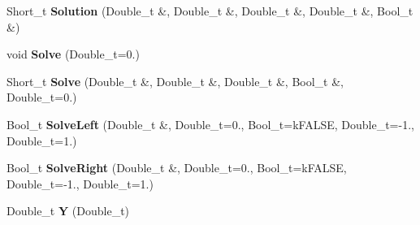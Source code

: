 \begin{DoxyCompactItemize}
\item 
\hypertarget{classTPoly3_aa320c3c29151434c537c06fb79dd5713}{Short\-\_\-t {\bfseries Solution} (Double\-\_\-t \&, Double\-\_\-t \&, Double\-\_\-t \&, Double\-\_\-t \&, Bool\-\_\-t \&)}\label{classTPoly3_aa320c3c29151434c537c06fb79dd5713}

\item 
\hypertarget{classTPoly3_acaf258c863d48dcb936b145ed6062e3b}{void {\bfseries Solve} (Double\-\_\-t=0.)}\label{classTPoly3_acaf258c863d48dcb936b145ed6062e3b}

\item 
\hypertarget{classTPoly3_a95f6a8297f08639f23e04de072ab81c1}{Short\-\_\-t {\bfseries Solve} (Double\-\_\-t \&, Double\-\_\-t \&, Double\-\_\-t \&, Bool\-\_\-t \&, Double\-\_\-t=0.)}\label{classTPoly3_a95f6a8297f08639f23e04de072ab81c1}

\item 
\hypertarget{classTPoly3_ad696d45f90cef69580ab4e10da7c80d5}{Bool\-\_\-t {\bfseries Solve\-Left} (Double\-\_\-t \&, Double\-\_\-t=0., Bool\-\_\-t=k\-F\-A\-L\-S\-E, Double\-\_\-t=-\/1., Double\-\_\-t=1.)}\label{classTPoly3_ad696d45f90cef69580ab4e10da7c80d5}

\item 
\hypertarget{classTPoly3_afc126bda29592c078cf8124671311cf1}{Bool\-\_\-t {\bfseries Solve\-Right} (Double\-\_\-t \&, Double\-\_\-t=0., Bool\-\_\-t=k\-F\-A\-L\-S\-E, Double\-\_\-t=-\/1., Double\-\_\-t=1.)}\label{classTPoly3_afc126bda29592c078cf8124671311cf1}

\item 
\hypertarget{classTPoly3_aff95d1e86fbafd348065a68cf7a6dc00}{Double\-\_\-t {\bfseries Y} (Double\-\_\-t)}\label{classTPoly3_aff95d1e86fbafd348065a68cf7a6dc00}

\end{DoxyCompactItemize}
